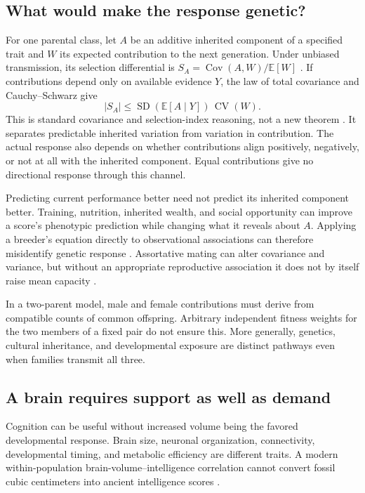 \documentclass[10pt,twocolumn,letterpaper]{article}
\newcommand{\E}{\mathbb{E}}
\newcommand{\Cov}{\operatorname{Cov}}
\newcommand{\SD}{\operatorname{SD}}
\newcommand{\CV}{\operatorname{CV}}
\begin{document}
\subsection{What would make the response genetic?}
For one parental class, let $A$ be an additive inherited component of a specified trait and $W$ its expected contribution to the next generation. Under unbiased transmission, its selection differential is $S_A=\Cov(A,W)/\E[W]$ \citep{price,lande1980}. If contributions depend only on available evidence $Y$, the law of total covariance and Cauchy--Schwarz give
\begin{equation}
|S_A|\leq\SD\!\left(\E[A\mid Y]\right)\,\CV(W).
\label{eq:bound}
\end{equation}
This is standard covariance and selection-index reasoning, not a new theorem \citep{hazel}. It separates predictable inherited variation from variation in contribution. The actual response also depends on whether contributions align positively, negatively, or not at all with the inherited component. Equal contributions give no directional response through this channel.

Predicting current performance better need not predict its inherited component better. Training, nutrition, inherited wealth, and social opportunity can improve a score's phenotypic prediction while changing what it reveals about $A$. Applying a breeder's equation directly to observational associations can therefore misidentify genetic response \citep{morrissey2010}. Assortative mating can alter covariance and variance, but without an appropriate reproductive association it does not by itself raise mean capacity \citep{horwitz}.

In a two-parent model, male and female contributions must derive from compatible counts of common offspring. Arbitrary independent fitness weights for the two members of a fixed pair do not ensure this. More generally, genetics, cultural inheritance, and developmental exposure are distinct pathways even when families transmit all three.

\subsection{A brain requires support as well as demand}
Cognition can be useful without increased volume being the favored developmental response. Brain size, neuronal organization, connectivity, developmental timing, and metabolic efficiency are different traits. A modern within-population brain-volume--intelligence correlation cannot convert fossil cubic centimeters into ancient intelligence scores \citep{pietschnig}.
\end{document}
